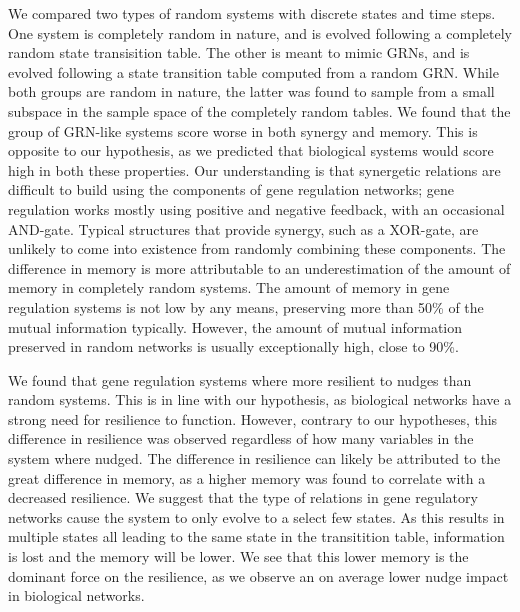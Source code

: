 \documentclass[../main.tex]{subfiles}
\begin{document}
We compared two types of random systems with discrete states and time steps.
One system is completely random in nature, and is evolved following a completely random state transisition table.
The other is meant to mimic GRNs, and is evolved following a state transition table computed from a random GRN. %
While both groups are random in nature, the latter was found to sample from a small subspace in the sample space of the completely random tables.
We found that the group of GRN-like systems score worse in both synergy and memory.
This is opposite to our hypothesis, as we predicted that biological systems would score high in both these properties.
Our understanding is that synergetic relations are difficult to build using the components of gene regulation networks; gene regulation works mostly using positive and negative feedback, with an occasional AND-gate.
Typical structures that provide synergy, such as a XOR-gate, are unlikely to come into existence from randomly combining these components.
The difference in memory is more attributable to an underestimation of the amount of memory in completely random systems.
The amount of memory in gene regulation systems is not low by any means, preserving more than 50\% of the mutual information typically.
However, the amount of mutual information preserved in random networks is usually exceptionally high, close to 90\%.

We found that gene regulation systems where more resilient to nudges than random systems.
This is in line with our hypothesis, as biological networks have a strong need for resilience to function.
However, contrary to our hypotheses, this difference in resilience was observed regardless of how many variables in the system where nudged.
The difference in resilience can likely be attributed to the great difference in memory, as a higher memory was found to correlate with a decreased resilience.
We suggest that the type of relations in gene regulatory networks cause the system to only evolve to a select few states.
As this results in multiple states all leading to the same state in the transitition table, information is lost and the memory will be lower.
We see that this lower memory is the dominant force on the resilience, as we observe an on average lower nudge impact in biological networks.
\end{document}

